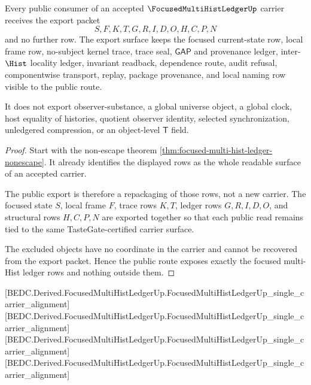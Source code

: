 \begin{theorem}
\label{thm:focused-multi-hist-ledger-public-export}
Every public consumer of an accepted $\FocusedMultiHistLedgerUp$ carrier receives the export packet
$$
S,F,K,T,G,R,I,D,O,H,C,P,N
$$
and no further row. The export surface keeps the focused current-state row, local frame row, no-subject kernel trace, trace seal, $\mathsf{GAP}$ and provenance ledger, inter-$\Hist$ locality ledger, invariant readback, dependence route, audit refusal, componentwise transport, replay, package provenance, and local naming row visible to the public route.

It does not export observer-substance, a global universe object, a global clock, host equality of histories, quotient observer identity, selected synchronization, unledgered compression, or an object-level $\mathsf{T}$ field.
\end{theorem}
\begin{proof}
Start with the non-escape theorem \autoref{thm:focused-multi-hist-ledger-nonescape}. It already identifies the displayed rows as the whole readable surface of an accepted carrier.

The public export is therefore a repackaging of those rows, not a new carrier. The focused state $S$, local frame $F$, trace rows $K,T$, ledger rows $G,R,I,D,O$, and structural rows $H,C,P,N$ are exported together so that each public read remains tied to the same TasteGate-certified carrier surface.

The excluded objects have no coordinate in the carrier and cannot be recovered from the export packet. Hence the public route exposes exactly the focused multi-Hist ledger rows and nothing outside them.
\end{proof}



[BEDC.Derived.FocusedMultiHistLedgerUp.FocusedMultiHistLedgerUp\_single\_carrier\_alignment]
[BEDC.Derived.FocusedMultiHistLedgerUp.FocusedMultiHistLedgerUp\_single\_carrier\_alignment]
[BEDC.Derived.FocusedMultiHistLedgerUp.FocusedMultiHistLedgerUp\_single\_carrier\_alignment]
[BEDC.Derived.FocusedMultiHistLedgerUp.FocusedMultiHistLedgerUp\_single\_carrier\_alignment]

